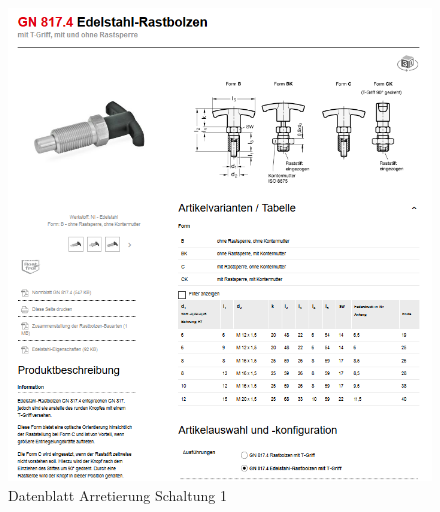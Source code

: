 \newpage
\begin{figure}[H]
	\includegraphics[width=1.1\textwidth,keepaspectratio]{figures/Rastbolzen.png}
	\caption{Datenblatt Arretierung Schaltung 1 \protect\cite{bib:www:rastbolzen}}
	\label{fig:rastbolzen}
\end{figure}


